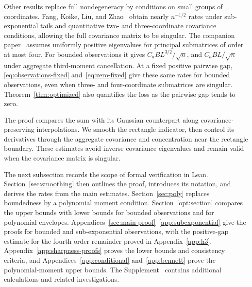 \documentclass[11pt,letterpaper]{article}
\theoremstyle{remark}
\begin{document}
Other results replace full nondegeneracy by conditions on small
groups of coordinates. Fang, Koike, Liu, and Zhao~\cite[Theorem~1.1]{FKLZ} obtain nearly
\(n^{-1/2}\) rates under sub-exponential tails and quantitative
two- and three-coordinate covariance conditions, allowing the full
covariance matrix to be singular. The companion paper~\cite{Local}
assumes uniformly positive eigenvalues for principal submatrices of
order at most four. For bounded observations it gives
\(C_aBL^{3/2}/\sqrt n\), and \(C_aBL/\sqrt n\) under aggregate
third-moment cancellation. At a fixed positive pairwise gap, \eqref{eq:observations-fixed}
and~\eqref{eq:zero-fixed} give these same rates for bounded observations,
even when three- and four-coordinate submatrices are singular.
Theorem~\ref{thm:optimized} also quantifies the loss as the pairwise
gap tends to zero.

The proof compares the sum with its Gaussian counterpart along
covariance-preserving interpolations. We smooth the rectangle indicator,
then control its derivatives through the aggregate covariance and
concentration near the rectangle boundary. These estimates avoid
inverse covariance eigenvalues and remain valid when the covariance
matrix is singular.

The next subsection records the scope of formal verification in Lean.
Section~\ref{sec:smoothing} then outlines the proof, introduces its
notation, and derives the rates from the main estimates.
Section~\ref{sec:poly} replaces boundedness by a polynomial moment
condition. Section~\ref{opt:section} compares the upper bounds with lower
bounds for bounded observations and for polynomial envelopes.
Appendices~\ref{sec:main-proof}--\ref{app:subexponential} give the
proofs for bounded and sub-exponential observations, with the
positive-gap estimate for the fourth-order remainder proved in
Appendix~\ref{app:h3}.
Appendix~\ref{app:sharpness-proofs} proves the lower bounds and consistency
criteria, and Appendices~\ref{app:conditional} and~\ref{app:bennett}
prove the polynomial-moment upper bounds. The
Supplement~\cite{Supplement} contains additional calculations and
related investigations.
\end{document}
